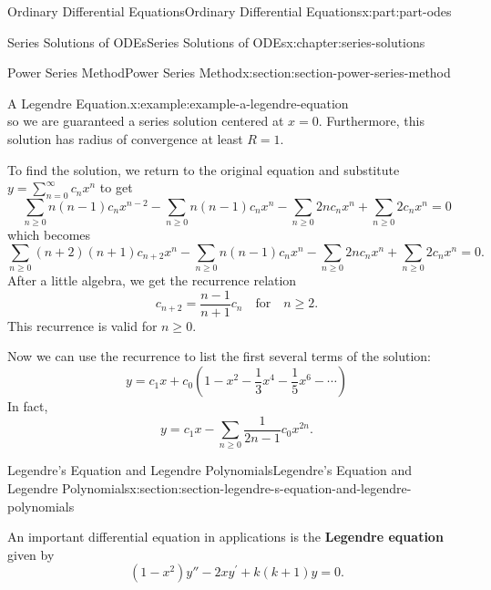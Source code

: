 \documentclass[twoside,10pt,]{book}
\newcommand{\terminology}[1]{\textbf{#1}}
\numberwithin{equation}{part}
\begin{document}
\begin{partptx}{Ordinary Differential Equations}{}{Ordinary Differential Equations}{}{}{x:part:part-odes}
\begin{chapterptx}{Series Solutions of ODEs}{}{Series Solutions of ODEs}{}{}{x:chapter:series-solutions}
\begin{sectionptx}{Power Series Method}{}{Power Series Method}{}{}{x:section:section-power-series-method}
\begin{example}{A Legendre Equation.}{x:example:example-a-legendre-equation}
\begin{equation*}
\end{equation*}
so we are guaranteed a series solution centered at \(x = 0\). Furthermore, this solution has radius of convergence at least \(R = 1\).%
\par
To find the solution, we return to the original equation and substitute \(y = \sum_{n=0}^{\infty}c_{n}x^{n}\) to get%
\begin{equation*}
\sum_{n\geq0}n(n-1)c_{n}x^{n-2} - \sum_{n\geq0}n(n-1)c_{n}x^{n} - \sum_{n\geq0}2nc_{n}x^{n} + \sum_{n\geq0}2c_{n}x^{n} = 0
\end{equation*}
which becomes%
\begin{equation*}
\sum_{n\geq0}(n + 2)(n+1)c_{n+2}x^{n} - \sum_{n\geq0}n(n-1)c_{n}x^{n} - \sum_{n\geq0}2nc_{n}x^{n} + \sum_{n\geq0}2c_{n}x^{n} = 0\text{.}
\end{equation*}
After a little algebra, we get the recurrence relation%
\begin{equation*}
c_{n+2} = \frac{n-1}{n+1}c_{n}\quad\text{for}\quad n\geq2\text{.}
\end{equation*}
This recurrence is valid for \(n\geq0\).%
\par
Now we can use the recurrence to list the first several terms of the solution:%
\begin{equation*}
y = c_{1}x + c_{0}(1 - x^{2} - \frac{1}{3}x^{4} - \frac{1}{5}x^{6} - \cdots)
\end{equation*}
In fact,%
\begin{equation*}
y = c_{1}x - \sum_{n\geq0}\frac{1}{2n - 1}c_{0}x^{2n}\text{.}
\end{equation*}
%
\end{example}
\end{sectionptx}
%
%
\typeout{************************************************}
\typeout{************************************************}
%
\begin{sectionptx}{Legendre's Equation and Legendre Polynomials}{}{Legendre's Equation and Legendre Polynomials}{}{}{x:section:section-legendre-s-equation-and-legendre-polynomials}
\begin{introduction}{}%
An important differential equation in applications is the \terminology{Legendre equation} given by%
\begin{equation}
(1 - x^{2})y'' - 2xy^\prime + k(k + 1)y = 0\text{.}\label{x:men:equation-legendre-ode}
\end{equation}

\end{introduction}
\end{sectionptx}
\end{chapterptx}
\end{partptx}
\end{document}
